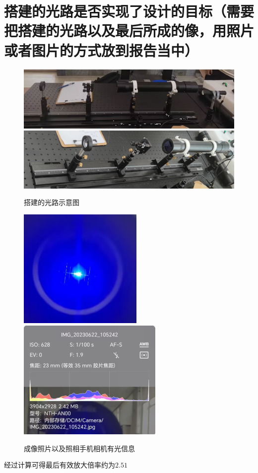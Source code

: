 \documentclass{article}
\begin{document}
\section{搭建的光路是否实现了设计的目标（需要把搭建的光路以及最后所成的像，用照片或者图片的方式放到报告当中）}
\begin{figure}[H]
  \centering
  \includegraphics[width=16cm]{img/23.png}
  \includegraphics[width=16cm]{img/25.png}

  \caption{搭建的光路示意图}
\end{figure}
\begin{figure}[H]
  \centering
  \includegraphics[width=6cm]{img/26.png}
  \includegraphics[width=7cm]{img/27.png}


  \caption{成像照片以及照相手机相机有光信息}
\end{figure}
经过计算可得最后有效放大倍率约为$2.51$
\end{document}
